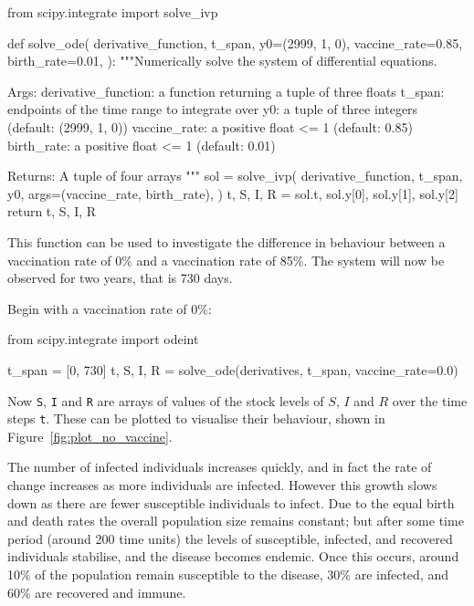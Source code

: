 \begin{pyin}
from scipy.integrate import solve_ivp


def solve_ode(
    derivative_function,
    t_span,
    y0=(2999, 1, 0),
    vaccine_rate=0.85,
    birth_rate=0.01,
):
    """Numerically solve the system of differential equations.

    Args:
        derivative_function: a function returning a tuple
                             of three floats
        t_span: endpoints of the time range to integrate over
        y0: a tuple of three integers (default: (2999, 1, 0))
        vaccine_rate: a positive float <= 1 (default: 0.85)
        birth_rate: a positive float <= 1 (default: 0.01)

    Returns:
        A tuple of four arrays
    """
    sol = solve_ivp(
        derivative_function,
        t_span,
        y0,
        args=(vaccine_rate, birth_rate),
    )
    t, S, I, R = sol.t, sol.y[0], sol.y[1], sol.y[2]
    return t, S, I, R
\end{pyin}

This function can be used to investigate the difference in behaviour between a
vaccination rate of 0\% and a vaccination rate of 85\%. The system will now be
observed for two years, that is 730 days.

Begin with a vaccination rate of 0\%:

\begin{pyin}
from scipy.integrate import odeint

t_span = [0, 730]
t, S, I, R = solve_ode(derivatives, t_span, vaccine_rate=0.0)
\end{pyin}

Now \texttt{S}, \texttt{I} and \texttt{R}
are arrays of values of the stock levels of $S$, $I$ and $R$ over the time
steps \texttt{t}.
These can be plotted to visualise their behaviour, shown in
Figure~\ref{fig:plot_no_vaccine}.

The number of infected individuals increases quickly, and in fact the rate of
change increases as more individuals are infected. However this growth slows
down as there are fewer susceptible individuals to infect. Due to the equal
birth and death rates the overall population size remains constant; but after
some time period (around 200 time units) the levels of susceptible,
infected, and recovered individuals stabilise, and the disease becomes
endemic. Once this occurs, around 10\% of the population remain susceptible to
the disease, 30\% are infected, and 60\% are recovered and immune.

